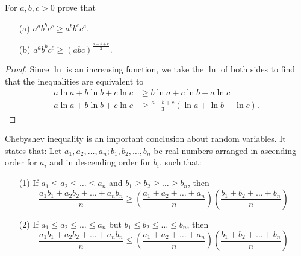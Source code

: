 \begin{exercise}
    For $a, b, c > 0$ prove that
    \begin{enumerate}
        \item[(a)] \(a^{a}b^{b}c^{c} \geq a^{b}b^{c}c^{a}\).
        \item[(b)] \(a^{a}b^{b}c^{c} \geq (abc)^{\frac{a+b+c}{3}}\).
    \end{enumerate}
\end{exercise}
\begin{proof}
    Since \(\ln\) is an increasing function, we take the \(\ln\) of both sides to find that the inequalities are equivalent to
\begin{align*}
    a\ln a + b\ln b + c\ln c &\geq b\ln a + c\ln b + a\ln c \\
    a\ln a + b\ln b + c\ln c &\geq \frac{a+b+c}{3}(\ln a + \ln b + \ln c).
\end{align*}
\end{proof}
\begin{exercise}
    Chebyshev inequality is an important conclusion about random variables. It states that:
    Let \( a_1, a_2, \ldots, a_n; b_1, b_2, \ldots, b_n \) be real numbers arranged in ascending order for \( a_i \) and in descending order for \( b_i \), such that:

\begin{enumerate}
    \item[(1)] If \( a_1 \leq a_2 \leq \ldots \leq a_n \) and \( b_1 \geq b_2 \geq \ldots \geq b_n \), then
    \[ \frac{a_1b_1 + a_2b_2 + \ldots + a_nb_n}{n} \geq \left( \frac{a_1 + a_2 + \ldots + a_n}{n} \right)\left( \frac{b_1 + b_2 + \ldots + b_n}{n} \right) \]

    \item[(2)] If \( a_1 \leq a_2 \leq \ldots \leq a_n \) but \( b_1 \leq b_2 \leq \ldots \leq b_n \), then
    \[ \frac{a_1b_1 + a_2b_2 + \ldots + a_nb_n}{n} \leq \left( \frac{a_1 + a_2 + \ldots + a_n}{n} \right)\left( \frac{b_1 + b_2 + \ldots + b_n}{n} \right) \]
\end{enumerate}
\end{exercise}

